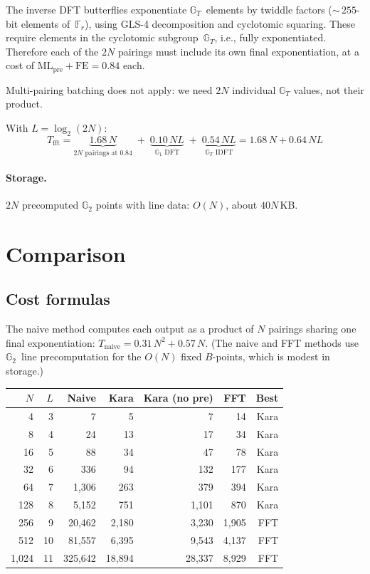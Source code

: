 \documentclass[11pt]{article}
\newcommand{\Gt}{\mathbb{G}_T}
\newcommand{\Gone}{\mathbb{G}_1}
\newcommand{\Gtwo}{\mathbb{G}_2}
\newcommand{\Fr}{\mathbb{F}_r}
\newcommand{\MLpre}{\mathrm{ML_{pre}}}
\newcommand{\FE}{\mathrm{FE}}
\theoremstyle{plain}
\theoremstyle{remark}
\begin{document}
The inverse DFT butterflies
exponentiate $\Gt$~elements by twiddle factors
(${\sim}\,255$-bit elements of~$\Fr$),
using GLS-4 decomposition and cyclotomic squaring.
These require elements in the cyclotomic subgroup~$\Gt$,
i.e., fully exponentiated.
Therefore each of the $2N$ pairings
must include its own final exponentiation,
at a cost of $\MLpre + \FE = 0.84$ each.

Multi-pairing batching does not apply:
we need $2N$ individual $\Gt$ values, not their product.

With $L = \log_2(2N)$:
\[
\boxed{T_{\mathrm{fft}}
= \underbrace{1.68\,N}_{2N \text{ pairings at } 0.84}
\;+\; \underbrace{0.10\,NL}_{\Gone\text{ DFT}}
\;+\; \underbrace{0.54\,NL}_{\Gt\text{ IDFT}}
= 1.68\,N + 0.64\,NL}
\]

\paragraph{Storage.}
$2N$ precomputed $\Gtwo$ points with line data:
$O(N)$, about $40N$\,KB.

\section{Comparison}

\subsection{Cost formulas}

The naive method computes each output
as a product of $N$ pairings sharing one final exponentiation:
$T_{\mathrm{naive}} = 0.31\,N^2 + 0.57\,N$.
(The naive and FFT methods use $\Gtwo$~line precomputation
for the $O(N)$ fixed $B$-points,
which is modest in storage.)

\begin{center}
\begin{tabular}{rrrrrrr}
\toprule
$N$ & $L$ & Naive & Kara & Kara (no pre) & FFT & Best \\
\midrule
4 & 3 & 7 & 5 & 7 & 14 & Kara \\
8 & 4 & 24 & 13 & 17 & 34 & Kara \\
16 & 5 & 88 & 34 & 47 & 78 & Kara \\
32 & 6 & 336 & 94 & 132 & 177 & Kara \\
64 & 7 & 1{,}306 & 263 & 379 & 394 & Kara \\
128 & 8 & 5{,}152 & 751 & 1{,}101 & 870 & Kara \\
256 & 9 & 20{,}462 & 2{,}180 & 3{,}230 & 1{,}905 & FFT \\
512 & 10 & 81{,}557 & 6{,}395 & 9{,}543 & 4{,}137 & FFT \\
1{,}024 & 11 & 325{,}642 & 18{,}894 & 28{,}337 & 8{,}929 & FFT \\
\bottomrule
\end{tabular}
\end{center}
\end{document}
